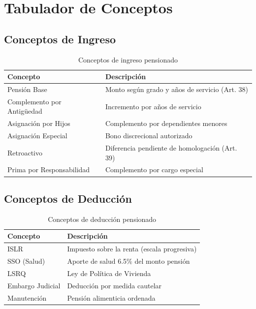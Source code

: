 \section{Tabulador de Conceptos}

\subsection*{Conceptos de Ingreso}

\begin{longtable}{p{4cm}p{8cm}}
\toprule
\textbf{Concepto} & \textbf{Descripción} \\
\midrule
\endhead
\bottomrule
\caption{Conceptos de ingreso pensionado}
\label{tab:conceptos-ingreso}
\endlastfoot

Pensión Base & Monto según grado y años de servicio (Art. 38) \\
Complemento por Antigüedad & Incremento por años de servicio \\
Asignación por Hijos & Complemento por dependientes menores \\
Asignación Especial & Bono discrecional autorizado \\
Retroactivo & Diferencia pendiente de homologación (Art. 39) \\
Prima por Responsabilidad & Complemento por cargo especial \\
\end{longtable}

\subsection*{Conceptos de Deducción}

\begin{longtable}{p{4cm}p{8cm}}
\toprule
\textbf{Concepto} & \textbf{Descripción} \\
\midrule
\endhead
\bottomrule
\caption{Conceptos de deducción pensionado}
\label{tab:conceptos-deduccion}
\endlastfoot

ISLR & Impuesto sobre la renta (escala progresiva) \\
SSO (Salud) & Aporte de salud 6.5\% del monto pensión \\
LSRQ & Ley de Política de Vivienda \\
Embargo Judicial & Deducción por medida cautelar \\
Manutención & Pensión alimenticia ordenada \\
\end{longtable}

